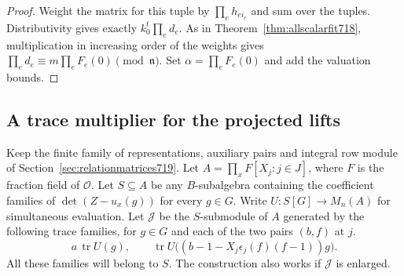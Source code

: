 \documentclass[a4paper,11pt]{article}
\theoremstyle{definition}
\theoremstyle{remark}
\numberwithin{equation}{section}
\begin{document}
\begin{proof}
Weight the matrix for this tuple by \(\prod_e h_{e i_e}\)
and sum over the tuples. Distributivity gives exactly
\(k_0^t\prod_e d_e\). As in Theorem~\ref{thm:allscalarfit718},
multiplication in increasing order of the weights gives
\(\prod_e d_e\equiv m\prod_e F_e(0)\pmod{\mathfrak n}\).
Set \(\alpha=\prod_e F_e(0)\) and add the valuation bounds.
\end{proof}
\clearpage


\subsection{A trace multiplier for the projected lifts}
\label{sec:tracemult720}

Keep the finite family of representations, auxiliary pairs and
integral row module of Section~\ref{sec:relationmatrices719}.
Let \(A=\prod_x F[X_j:j\in J]\), where \(F\) is the fraction
field of \(\mathcal O\). Let \(S\subseteq A\) be any \(B\)-subalgebra
containing the coefficient families of \(\det(Z-u_x(g))\) for
every \(g\in G\). Write \(U:S[G]\to M_n(A)\) for simultaneous
evaluation. Let \(\mathcal J\) be the \(S\)-submodule of \(A\)
generated by the following trace families, for \(g\in G\) and
each of the two pairs \((b,f)\) at \(j\).
\[
 a\,\operatorname{tr} U(g),\qquad
 \operatorname{tr}U\bigl((b-1-X_j\epsilon_j(f)(f-1))g\bigr).
\]
All these families will belong to \(S\). The construction also
works if \(\mathcal J\) is enlarged.
\end{document}
